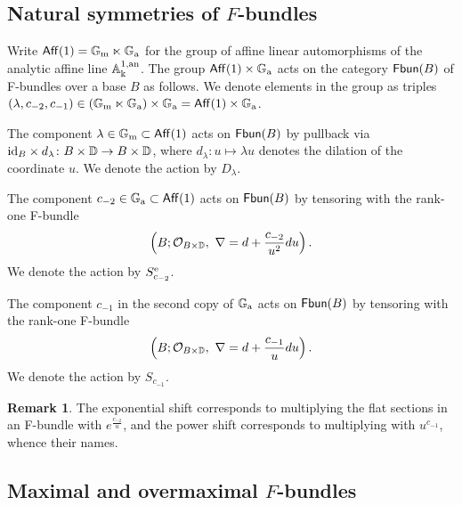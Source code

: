 \documentclass[twoside,leqno]{article}
\numberwithin{equation}{section}
\theoremstyle{plain}
\theoremstyle{definition}
\newtheorem{remark}[equation]{Remark}
\begin{document}
\subsection{Natural symmetries of \texorpdfstring{$F$}{F}-bundles}

Write $\mathsf{Aff}(1) = \mathbb G_\mathrm{m}\ltimes \mathbb G_\mathrm{a}$ for the group of affine linear automorphisms of the analytic affine line $\mathbb{A}^{1,\operatorname{an}}_{\Bbbk}$.
The group $\mathsf{Aff}(1)\times\mathbb G_\mathrm{a}$ acts on the category $\operatorname{{\sf Fbun}}(B)$ of F-bundles over a base $B$ as follows.
We denote elements in the group as triples
$(\lambda,c_{-2},c_{-1}) \in (\mathbb G_\mathrm{m} \ltimes \mathbb G_\mathrm{a})\times \mathbb G_\mathrm{a} = \mathsf{Aff}(1)\times \mathbb G_\mathrm{a}$.
\begin{description}[wide]
  \item[\emph{Dilation}:] The component $\lambda\in \mathbb G_\mathrm{m}\subset \mathsf{Aff}(1)$ acts on $\operatorname{{\sf Fbun}}(B)$ by pullback via $\mathrm{id}_B \times d_\lambda \colon B\times \mathbb D \to B\times \mathbb D$, where $d_\lambda\colon u \mapsto \lambda u$ denotes the dilation of the coordinate $u$.
  We denote the action by $D_\lambda$.
  \item[\emph{Exponential shift}:] The component $c_{-2} \in \mathbb G_\mathrm{a} \subset \mathsf{Aff}(1)$ acts on $\operatorname{{\sf Fbun}}(B)$ by tensoring with the rank-one F-bundle
  \begin{equation} \label{eq:exponential_shifts}
  \left(B;\mathcal{O}_{B\times \mathbb D},\ \nabla = d + \frac{c_{-2}}{u^2} du\right).
  \end{equation}
  We denote the action by $S^\mathrm{e}_{c_{-2}}$.
  \item[\emph{Power shift}:] The component $c_{-1}$ in the second copy of $\mathbb G_\mathrm{a}$ acts on $\operatorname{{\sf Fbun}}(B)$ by tensoring with the rank-one F-bundle
  \begin{equation} \label{eq:power_shifts}
    \left(B;\mathcal{O}_{B\times \mathbb D},\ \nabla = d + \frac{c_{-1}}{u} du\right).
  \end{equation}
  We denote the action by $S_{c_{-1}}$.
\end{description}

\begin{remark} \label{rem:action}
  The exponential shift corresponds to multiplying the flat sections in an F-bundle  with $e^\frac{c_{-2}}{u}$, and the power shift corresponds to multiplying  with $u^{c_{-1}}$, whence their names.
\end{remark}

\subsection{Maximal and overmaximal \texorpdfstring{$F$}{F}-bundles} \label{sec:maximal}
\end{document}
